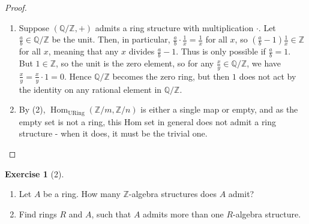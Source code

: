 \documentclass[reqno]{amsart}
\theoremstyle{definition}
\newtheorem{exercise}[theorem]{Exercise}
\theoremstyle{remark}
\DeclareMathOperator{\Hom}{Hom}
\DeclareMathOperator{\URing}{URing}
\begin{document}
\begin{proof}
\begin{enumerate}
    \item Suppose $\left( \mathbb{Q}/ \mathbb{Z},
        +\right) $ admits a ring structure with
        multiplication $\cdot $. Let
        $\frac{a}{b} \in \mathbb{Q} / \mathbb{Z}$ be
        the unit. 
        Then, in particular,
        $\frac{a}{b} \cdot  \frac{1}{x} = \frac{1}{x}$ for all
        $x$, so
        $\left( \frac{a}{b}-1 \right) \frac{1}{x}
        \in \mathbb{Z}$ for all $x$, meaning that
        any $x$ divides $\frac{a}{b}-1$. Thus is only
        possible if $\frac{a}{b} = 1$. But
        $1 \in \mathbb{Z}$, so
        the unit is the zero element, so
        for any $\frac{x}{y} \in \mathbb{Q} /\mathbb{Z}$, we
        have $\frac{x}{y}= \frac{x}{y}\cdot 1
        = 0$. Hence
        $\mathbb{Q} / \mathbb{Z}$ becomes the zero ring,
        but then $1$ does not act by the identity
        on any rational element in $\mathbb{Q} / \mathbb{Z}$.
    \item By (2), 
        $\Hom_{\URing}\left( \mathbb{Z}/m, \mathbb{Z}/n \right) $ 
        is either a single map or empty, and as
        the empty set is not a ring, this
        Hom set in general does not admit a ring
        structure - when it does, it must be
        the trivial one.
        \end{enumerate}
    \end{proof}


\begin{exercise}[2]
    \begin{enumerate}
        \item Let $A$ be a ring. How many
            $\mathbb{Z}$-algebra structures does $A$ admit?
        \item Find rings $R$ and $A$, such that
            $A$ admits more than one $R$-algebra structure.
    \end{enumerate}
\end{exercise}
\end{document}
